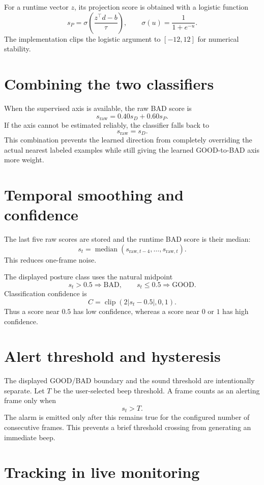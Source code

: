 \documentclass[11pt,a4paper]{article}
\begin{document}
For a runtime vector $z$, its projection score is obtained with a logistic
function
\[
s_P=\sigma\left(\frac{z^\top d-b}{\tau}\right),
\qquad
\sigma(u)=\frac{1}{1+e^{-u}}.
\]
The implementation clips the logistic argument to $[-12,12]$ for numerical
stability.

\section{Combining the two classifiers}

When the supervised axis is available, the raw BAD score is
\[
s_{\mathrm{raw}}=0.40s_D+0.60s_P.
\]
If the axis cannot be estimated reliably, the classifier falls back to
\[
s_{\mathrm{raw}}=s_D.
\]
This combination prevents the learned direction from completely overriding the
actual nearest labeled examples while still giving the learned GOOD-to-BAD axis
more weight.

\section{Temporal smoothing and confidence}

The last five raw scores are stored and the runtime BAD score is their median:
\[
s_t=\operatorname{median}
\left(s_{\mathrm{raw},t-4},\ldots,s_{\mathrm{raw},t}\right).
\]
This reduces one-frame noise.

The displayed posture class uses the natural midpoint
\[
s_t>0.5 \Rightarrow \mathrm{BAD},
\qquad
s_t\le 0.5 \Rightarrow \mathrm{GOOD}.
\]
Classification confidence is
\[
C=\operatorname{clip}\left(2|s_t-0.5|,0,1\right).
\]
Thus a score near $0.5$ has low confidence, whereas a score near $0$ or $1$ has
high confidence.

\section{Alert threshold and hysteresis}

The displayed GOOD/BAD boundary and the sound threshold are intentionally
separate. Let $T$ be the user-selected beep threshold. A frame counts as an
alerting frame only when
\[
s_t>T.
\]
The alarm is emitted only after this remains true for the configured number of
consecutive frames. This prevents a brief threshold crossing from generating an
immediate beep.

\section{Tracking in live monitoring}
\end{document}
